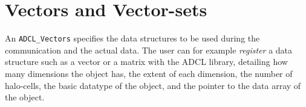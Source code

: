 \section{Vectors and Vector-sets}

An {\tt ADCL\_Vectors} specifies the data structures to be used during the communication and the actual data. The user can for example {\it register} a data structure such as a vector or a matrix with the ADCL library, detailing how many dimensions the object has, the extent of each dimension, the number of halo-cells, the basic datatype of the object, and the pointer to the data array of the object.